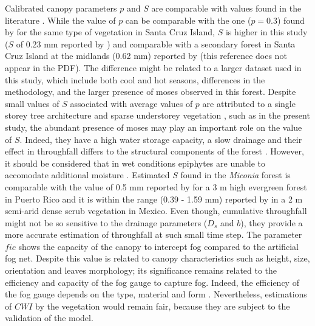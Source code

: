 \documentclass[a4paper,12pt]{article}
\begin{document}
\begin{linenumbers}
Calibrated canopy parameters $p$ and $S$ are comparable with values found in the literature \citep{Aston1979, Lloydetal1988, WallaceandMcJannet2008, Takahashietal2011, Holwerdaetal2012}. While the value of $p$ can be comparable with the one ($p=0.3$) found by \cite{Pryetetal2012a} for the same type of vegetation in Santa Cruz Island, $S$ is higher in this study ($S$ of 0.23 mm reported by \cite{Pryetetal2012a}) and comparable with a secondary forest in Santa Cruz Island at the midlands (0.62 mm) reported by \cite{Dominguezetal2016} (this reference does not appear in the PDF). The difference might be related to a larger dataset used in this study, which include both cool and hot seasons, differences in the methodology, and the larger presence of moses observed in this forest. Despite small values of $S$ associated with average values of $p$ are attributed to a single storey tree architecture and sparse understorey vegetation \citep{Pryetetal2012a}, such as in the present study, the abundant presence of moses may play an important role on the value of $S$. Indeed, they have a high water storage capacity, a slow drainage and their effect in throughfall differs to the structural components of the forest \citep{Richardsonetal2000, Kohleretal2007, Villegasetal2008}. However, it should be considered that in wet conditions epiphytes are unable to accomodate additional moisture \citep{Holscheretal2004}. Estimated $S$ found in the \textit{Miconia} forest is comparable with the value of 0.5 mm reported by \cite{Holwerdaetal2006} for a 3 m high evergreen forest in Puerto Rico and it is within the range (0.39 - 1.59 mm) reported by \cite{NavarndBryan1994} in a 2 m semi-arid dense scrub vegetation in Mexico. Even though, cumulative throughfall might not be so sensitive to the drainage parameters ($D_s$ and $b$), they provide a more accurate estimation of throughfall at such small time step. The parameter $fic$ shows the capacity of the canopy to intercept fog compared to the artificial fog net. Despite this value is related to canopy characteristics such as height, size, orientation and leaves morphology; its significance remains related to the efficiency and capacity of the fog gauge to capture fog. Indeed, the efficiency of the fog gauge depends on the type, material and form \citep{Villegasetal2008}. Nevertheless, estimations of $CWI$ by the vegetation would remain fair, because they are subject to the validation of the model. 


\end{linenumbers}
\end{document}
